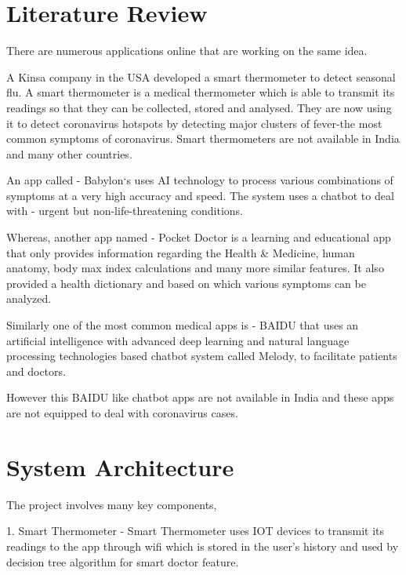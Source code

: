 \documentclass[10pt,twocolumn,letterpaper]{article}
\begin{document}
\section{Literature Review}

There are numerous applications online that are working on the same idea.


A Kinsa company in the USA developed a smart thermometer to detect seasonal flu. A smart thermometer is a medical thermometer which is able to transmit its readings so that they can be collected, stored and analysed. They are now using it to detect coronavirus hotspots by detecting major clusters of fever-the most common symptoms of coronavirus. Smart thermometers are not available in India and many other countries.~\cite{smart-thermometer}


An app called - Babylon‘s uses AI technology to process various combinations of symptoms at a very high accuracy and speed. The system uses a chatbot to deal with - urgent but non-life-threatening conditions.~\cite{babylon}


Whereas, another app named - Pocket Doctor is a learning and educational app that only provides information regarding the Health & Medicine, human anatomy, body max index calculations and many more similar features. It also provided a health dictionary and based on which various symptoms can be analyzed.~\cite{doctor-pocket}


Similarly one of the most common medical apps is - BAIDU that uses an artificial intelligence with advanced deep learning and natural language processing technologies based chatbot system called Melody, to facilitate patients and doctors.~\cite{baidu-doctor}


However this BAIDU like chatbot apps are not available in India and these apps are not equipped to deal with coronavirus cases.

\section{System Architecture}

The project involves many key components,


1. Smart Thermometer -  Smart Thermometer uses IOT devices to transmit its readings to the app through wifi which is stored in the user's history and used by decision tree algorithm for smart doctor feature.~\cite{smart-thermometer}
\end{document}
